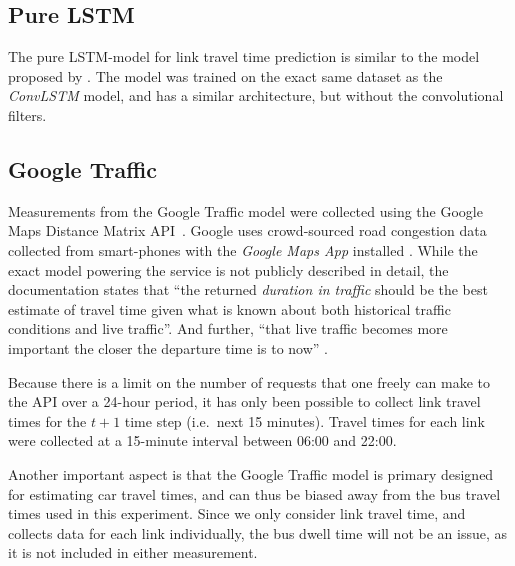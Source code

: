 ﻿\documentclass[preprint,11pt,5p,twocolumn]{elsarticle}
\begin{document}
\subsection{Pure LSTM}
The pure LSTM-model for link travel time prediction is similar to the model proposed by \citet{YanjieDuan2016}. The model was trained on the exact same dataset as the \emph{ConvLSTM} model, and has a similar architecture, but without the convolutional filters.

\subsection{Google Traffic}
Measurements from the Google Traffic model were collected using the Google Maps Distance Matrix API~\citep{GMaps_DistanceMatrixAPI}. Google uses crowd-sourced road congestion data collected from smart-phones with the \emph{Google Maps App} installed \citep{GMaps_Crowdsourcing}. While the exact model powering the service is not publicly described in detail, the documentation states that ``the returned \emph{duration in traffic} should be the best estimate of travel time given what is known about both historical traffic conditions and live traffic''. And further, ``that live traffic becomes more important the closer the departure time is to now'' \citep{GMaps_DistanceMatrixAPI}.

Because there is a limit on the number of requests that one freely can make to the API over a 24-hour period, it has only been possible to collect link travel times for the $t + 1$ time step (i.e.\ next 15 minutes). Travel times for each link were collected at a 15-minute interval between 06:00 and 22:00.

Another important aspect is that the Google Traffic model is primary designed for estimating car travel times, and can thus be biased away from the bus travel times used in this experiment. Since we only consider link travel time, and collects data for each link individually, the bus dwell time will not be an issue, as it is not included in either measurement.
\end{document}
